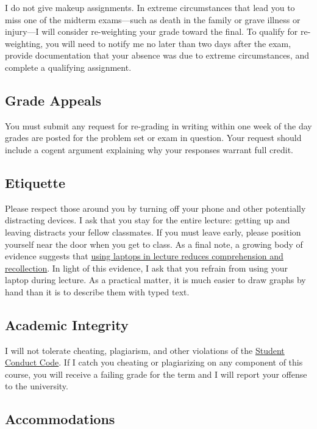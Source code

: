 \documentclass[11pt]{article}
\begin{document}
I do not give makeup assignments. In extreme circumstances that lead you to miss one of the midterm exams---such as death in the family or grave illness or injury---I will consider re-weighting your grade toward the final. To qualify for re-weighting, you will need to notify me no later than two days after the exam, provide documentation that your absence was due to extreme circumstances, and complete a qualifying assignment.

\subsection*{Grade Appeals} 

You must submit any request for re-grading in writing within one week of the day grades are posted for the problem set or exam in question. Your request should include a cogent argument explaining why your responses warrant full credit.

\subsection*{Etiquette} 

Please respect those around you by turning off your phone and other potentially distracting devices. I ask that you stay for the entire lecture: getting up and leaving distracts your fellow classmates. If you must leave early, please position yourself near the door when you get to class. As a final note, a growing body of evidence suggests that \href{https://www.theverge.com/2017/11/27/16703904/laptop-learning-lecture}{using laptops in lecture reduces comprehension and recollection}. In light of this evidence, I ask that you refrain from using your laptop during lecture. As a practical matter, it is much easier to draw graphs by hand than it is to describe them with typed text. 

\subsection*{Academic Integrity} 

I will not tolerate cheating, plagiarism, and other violations of the \href{https://studentlife.uoregon.edu/conduct}{Student Conduct Code}. If I catch you cheating or plagiarizing on any component of this course, you will receive a failing grade for the term and I will report your offense to the university. 

\subsection*{Accommodations} 
\end{document}
